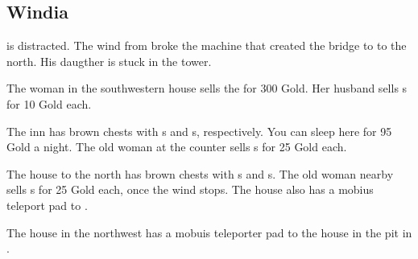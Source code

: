 \subsection{Windia}
\label{map:windia}

 is distracted. The wind from  broke the machine that created the bridge to  to the north. His daugther  is stuck in the tower.

The woman in the southwestern house sells the  for 300 Gold. Her husband sells s for 10 Gold each. 

The inn has brown chests with s and s, respectively. You can sleep here for 95 Gold a night. The old woman at the counter sells s for 25 Gold each.

The house to the north has brown chests with s and s. The old woman nearby sells s for 25 Gold each, once the wind stops. The house also has a mobius teleport pad to .

The house in the northwest has a mobuis teleporter pad to the house in the pit in .
